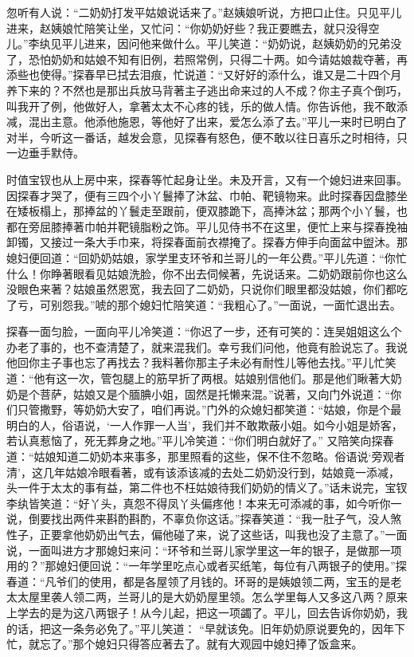\begin{parag}


    忽听有人说：“二奶奶打发平姑娘说话来了。”赵姨娘听说，方把口止住。只见平儿进来，赵姨娘忙陪笑让坐，又忙问：“你奶奶好些？我正要瞧去，就只没得空儿。”李纨见平儿进来，因问他来做什么。平儿笑道：“奶奶说，赵姨奶奶的兄弟没了，恐怕奶奶和姑娘不知有旧例，若照常例，只得二十两。如今请姑娘裁夺著，再添些也使得。”探春早已拭去泪痕，忙说道：“又好好的添什么，谁又是二十四个月养下来的？不然也是那出兵放马背著主子逃出命来过的人不成？你主子真个倒巧，叫我开了例，他做好人，拿著太太不心疼的钱，乐的做人情。你告诉他，我不敢添减，混出主意。他添他施恩，等他好了出来，爱怎么添了去。”平儿一来时已明白了对半，今听这一番话，越发会意，见探春有怒色，便不敢以往日喜乐之时相待，只一边垂手默侍。
\end{parag}


\begin{parag}


    时值宝钗也从上房中来，探春等忙起身让坐。未及开言，又有一个媳妇进来回事。因探春才哭了，便有三四个小丫鬟捧了沐盆、巾帕、靶镜物来。此时探春因盘膝坐在矮板榻上，那捧盆的丫鬟走至跟前，便双膝跪下，高捧沐盆；那两个小丫鬟，也都在旁屈膝捧著巾帕并靶镜脂粉之饰。平儿见侍书不在这里，便忙上来与探春挽袖卸镯，又接过一条大手巾来，将探春面前衣襟掩了。探春方伸手向面盆中盥沐。那媳妇便回道：“回奶奶姑娘，家学里支环爷和兰哥儿的一年公费。”平儿先道：“你忙什么！你睁著眼看见姑娘洗脸，你不出去伺候著，先说话来。二奶奶跟前你也这么没眼色来著？姑娘虽然恩宽，我去回了二奶奶，只说你们眼里都没姑娘，你们都吃了亏，可别怨我。”唬的那个媳妇忙陪笑道：“我粗心了。”一面说，一面忙退出去。
\end{parag}


\begin{parag}


    探春一面匀脸，一面向平儿冷笑道：“你迟了一步，还有可笑的：连吴姐姐这么个办老了事的，也不查清楚了，就来混我们。幸亏我们问他，他竟有脸说忘了。我说他回你主子事也忘了再找去？我料著你那主子未必有耐性儿等他去找。”平儿忙笑道：“他有这一次，管包腿上的筋早折了两根。姑娘别信他们。那是他们瞅著大奶奶是个菩萨，姑娘又是个腼腆小姐，固然是托懒来混。”说著，又向门外说道：“你们只管撒野，等奶奶大安了，咱们再说。”门外的众媳妇都笑道：“姑娘，你是个最明白的人，俗语说，‘一人作罪一人当’，我们并不敢欺蔽小姐。如今小姐是娇客，若认真惹恼了，死无葬身之地。”平儿冷笑道：“你们明白就好了。” 又陪笑向探春道：“姑娘知道二奶奶本来事多，那里照看的这些，保不住不忽略。俗语说‘旁观者清’，这几年姑娘冷眼看著，或有该添该减的去处二奶奶没行到，姑娘竟一添减，头一件于太太的事有益，第二件也不枉姑娘待我们奶奶的情义了。”话未说完，宝钗李纨皆笑道：“好丫头，真怨不得凤丫头偏疼他！本来无可添减的事，如今听你一说，倒要找出两件来斟酌斟酌，不辜负你这话。”探春笑道：“我一肚子气，没人煞性子，正要拿他奶奶出气去，偏他碰了来，说了这些话，叫我也没了主意了。”一面说，一面叫进方才那媳妇来问：“环爷和兰哥儿家学里这一年的银子，是做那一项用的？”那媳妇便回说：“一年学里吃点心或者买纸笔，每位有八两银子的使用。”探春道：“凡爷们的使用，都是各屋领了月钱的。环哥的是姨娘领二两，宝玉的是老太太屋里袭人领二两，兰哥儿的是大奶奶屋里领。怎么学里每人又多这八两？原来上学去的是为这八两银子！从今儿起，把这一项蠲了。平儿，回去告诉你奶奶，我的话，把这一条务必免了。”平儿笑道： “早就该免。旧年奶奶原说要免的，因年下忙，就忘了。”那个媳妇只得答应著去了。就有大观园中媳妇捧了饭盒来。
\end{parag}


